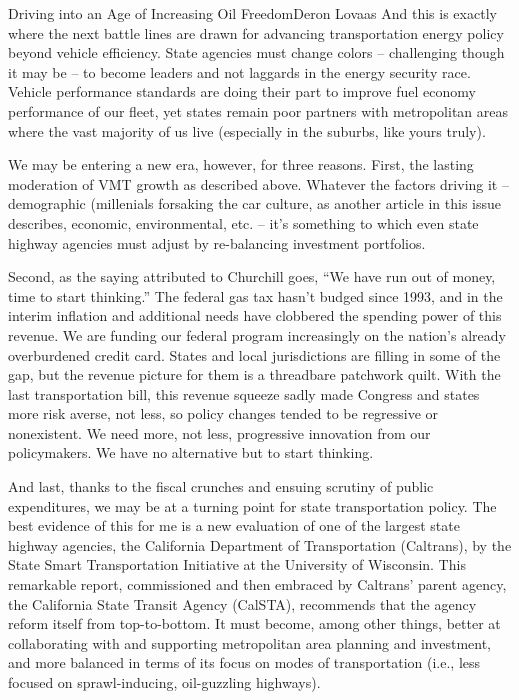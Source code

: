 \documentclass{papertex}
\begin{document}
\begin{news}{2}{Driving into an Age of Increasing Oil Freedom}{Deron Lovaas}{}{}
And this is exactly where the next battle lines are drawn for advancing 
transportation energy policy beyond vehicle efficiency. State agencies must 
change colors – challenging though it may be – to become leaders and not 
laggards in the energy security race. Vehicle performance standards are doing 
their part to improve fuel economy performance of our fleet, yet states remain 
poor partners with metropolitan areas where the vast majority of us live 
(especially in the suburbs, like yours truly).

We may be entering a new era, however, for three reasons. First, the lasting 
moderation of VMT growth as described above. Whatever the factors driving it – 
demographic (millenials forsaking the car culture, as another article in this 
issue describes, economic, environmental, etc. – it’s something to which even 
state highway agencies must adjust by re-balancing investment portfolios.

Second, as the saying attributed to Churchill goes, “We have run out of money, 
time to start thinking.” The federal gas tax hasn’t budged since 1993, and in 
the interim inflation and additional needs have clobbered the spending power 
of this revenue. We are funding our federal program increasingly on the 
nation’s already overburdened credit card. States and local jurisdictions are 
filling in some of the gap, but the revenue picture for them is a threadbare 
patchwork quilt. With the last transportation bill, this revenue squeeze sadly 
made Congress and states more risk averse, not less, so policy changes tended 
to be regressive or nonexistent. We need more, not less, progressive 
innovation from our policymakers. We have no alternative but to start 
thinking.

And last, thanks to the fiscal crunches and ensuing scrutiny of public 
expenditures, we may be at a turning point for state transportation policy. 
The best evidence of this for me is a new evaluation of one of the largest 
state highway agencies, the California Department of Transportation 
(Caltrans), by the State Smart Transportation Initiative at the University of 
Wisconsin. This remarkable report, commissioned and then embraced by Caltrans’ 
parent agency, the California State Transit Agency (CalSTA), recommends that 
the agency reform itself from top-to-bottom. It must become, among other 
things, better at collaborating with and supporting metropolitan area planning 
and investment, and more balanced in terms of its focus on modes of 
transportation (i.e., less focused on sprawl-inducing, oil-guzzling highways).


\end{news}
\end{document}
